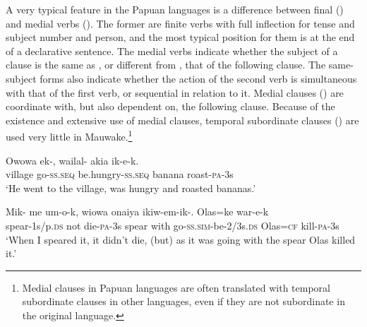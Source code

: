 A very typical feature in the Papuan languages is a difference between final () and medial verbs (). The former are finite verbs with full inflection for tense and subject number and person, and the most typical position for them is at the end of a declarative sentence. The medial verbs indicate whether the subject of a clause is the same as , or different from , that of the following clause. The same-subject forms also indicate whether the action of the second verb is simultaneous with that of the first verb, or sequential  in relation to it. Medial clauses () are coordinate with, but also dependent on, the following clause. Because of the existence and extensive use of medial clauses, temporal subordinate clauses () are used very little in Mauwake.\footnote{Medial clauses in Papuan languages are often translated with temporal subordinate clauses in other languages, even if they are not subordinate in the original language.}

\ea%
\label{ex:1:x662}
\gll Owowa  ek-,  wailal-  akia  ik-e-k. \\
village  go-\textsc{ss.seq} be.hungry-\textsc{ss.seq} banana  roast-\textsc{pa}-3s      \\
\glt `He went to the village, was hungry and roasted bananas.'
\z


 
\ea%
\label{ex:1:x663}
\gll Mik-   me  um-o-k,  wiowa  onaiya  ikiw-em-ik-. Olas=ke  war-e-k\\
spear-1s/p.\textsc{ds}  not  die-\textsc{pa}-3s  spear  with  go-\textsc{ss.sim}-be-2/3s.\textsc{ds} Olas=\textsc{cf}  kill-\textsc{pa}-3s\\
\glt`When I speared it, it didn't die, (but) as it was going with the spear Olas killed it.'
\z


